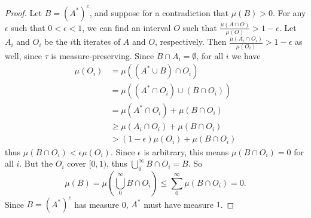 \documentclass[10pt]{article}
\begin{document}
\begin{enumerate}
\begin{enumerate}
\begin{proof}
Let $B = (A^*)^c$, and suppose for a contradiction that $\mu(B) > 0$.  For any $\epsilon$ such that $0 < \epsilon < 1$, we can find an interval $O$ such that $\frac{\mu(A \cap O)}{\mu(O)} > 1 - \epsilon$.  Let $A_i$ and $O_i$ be the $i$th iterates of $A$ and $O$, respectively.  Then $\frac{\mu(A_i \cap O_i)}{\mu(O_i)} > 1 - \epsilon$ as well, since $\tau$ is measure-preserving.  Since $B \cap A_i = \emptyset$, for all $i$ we have
\begin{align*}
\mu(O_i) &= \mu((A^* \cup B) \cap O_i) \\
&= \mu((A^* \cap O_i) \cup (B \cap O_i)) \\
&= \mu(A^* \cap O_i) + \mu(B \cap O_i) \\
&\geq \mu(A_i \cap O_i) + \mu(B \cap O_i) \\
&> (1-\epsilon)\mu(O_i) + \mu(B \cap O_i)
\end{align*}
thus $\mu(B \cap O_i) < \epsilon \mu(O_i)$.  Since $\epsilon$ is arbitrary, this means $\mu(B \cap O_i) = 0$ for all $i$.  But the $O_i$ cover $[0,1)$, thus $\bigcup_0^\infty B \cap O_i = B$.  So
$$
\mu(B) = \mu(\bigcup_0^\infty B \cap O_i) \leq \sum_0^\infty \mu(B \cap O_i) = 0.
$$
Since $B = (A^*)^c$ has measure 0, $A^*$ must have measure $1$.
\end{proof}

\end{enumerate}
\end{enumerate}
\end{document}
